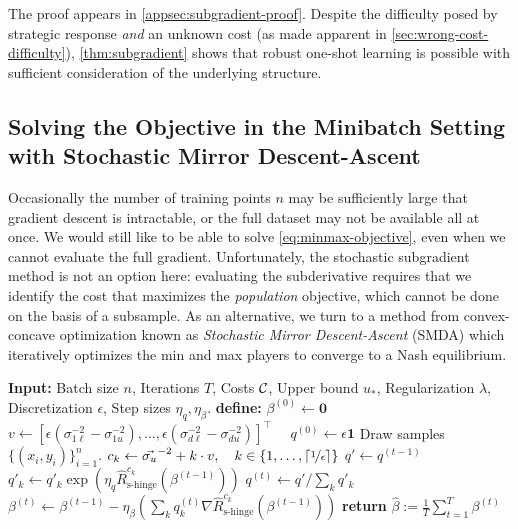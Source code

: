 \documentclass{article}
\newcommand{\costset}{\gC}
\newcommand{\shingeemprisk}{\hat R_{\textrm{s-hinge}}}
\newcommand{\uinv}{\ensuremath{u_{*}}}
\newcommand{\mincostscale}[1]{\sigma_{#1\ell}}
\newcommand{\maxcostscale}[1]{\sigma_{#1u}}
\theoremstyle{definition}
\begin{document}
The proof appears in \cref{appsec:subgradient-proof}. Despite the difficulty posed by strategic response \emph{and} an unknown cost (as made apparent in \cref{sec:wrong-cost-difficulty}), \cref{thm:subgradient} shows that robust one-shot learning is possible with sufficient consideration of the underlying structure. 

\subsection{Solving the Objective in the Minibatch Setting with Stochastic Mirror Descent-Ascent}
Occasionally the number of training points $n$ may be sufficiently large that gradient descent is intractable, or the full dataset may not be available all at once. We would still like to be able to solve \cref{eq:minmax-objective}, even when we cannot evaluate the full gradient. Unfortunately, the stochastic subgradient method is not an option here: evaluating the subderivative requires that we identify the cost that maximizes the \emph{population} objective, which cannot be done on the basis of a subsample. As an alternative, we turn to a method from convex-concave optimization known as \emph{Stochastic Mirror Descent-Ascent} (SMDA) \citep{nemirovski2009robust} which iteratively optimizes the min and max players to converge to a Nash equilibrium.


\begin{algorithm}[t]
\caption{Stochastic Mirror Descent-Ascent on the regularized strategic hinge loss}
\label{alg:mirror-descent}
\begin{algorithmic}
\STATE \textbf{Input:} Batch size $n$, Iterations $T$, Costs $\costset$, Upper bound $\uinv$, Regularization $\lambda$, Discretization $\epsilon$, Step sizes $\eta_q, \eta_\beta$.
\STATE \textbf{define:}\; $\beta^{(0)} \gets \mathbf{0}$
\STATE \qquad\quad\ \ $v \gets [\epsilon(\mincostscale{1}^{-2}-\maxcostscale{1}^{-2}),\ldots, \epsilon(\mincostscale{d}^{-2}-\maxcostscale{d}^{-2})]^\top$
\STATE \qquad\quad\ \ $q^{(0)} \gets \epsilon \mathbf{1}$
\STATE Draw samples $\{(x_i, y_i)\}_{i=1}^n$.
\STATE $c_{k} \gets \vec{\sigma_u}^{-2} + k\cdot v, \quad k\in\{1,\ldots,\lceil\nicefrac{1}{\epsilon}\rceil\}$
\STATE $q' \gets q^{(t-1)}$
\STATE $q'_{k} \gets q'_{k} \exp(\eta_q \shingeemprisk^{c_k}(\beta^{(t-1)}))$
\STATE $q^{(t)} \gets q' / \sum_k q'_{k}$
\STATE $\beta^{(t)} \gets \beta^{(t-1)} - \eta_{\beta} \left( \sum_k q_{k}^{(t)} \nabla \shingeemprisk^{c_k}(\beta^{(t-1)}) \right)$
\ENDFOR
\STATE \textbf{return} $\hat\beta := \frac{1}{T} \sum_{t=1}^T \beta^{(t)}$
\end{algorithmic}
\end{algorithm}
\end{document}
